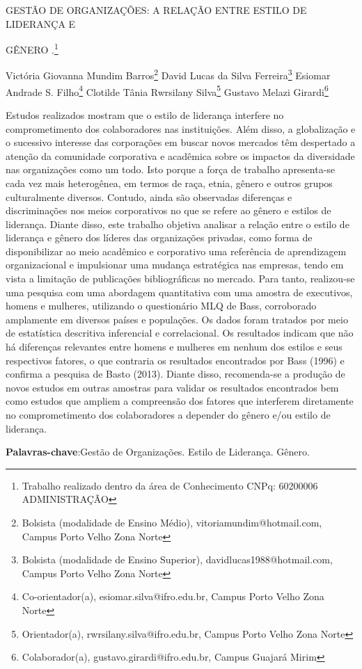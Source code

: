 \documentclass[article,12pt,onesidea,4paper,english,brazil]{abntex2}
\begin{document}
	
	
	\frenchspacing 
	
	\begin{center}
		\LARGE GESTÃO DE ORGANIZAÇÕES: A RELAÇÃO ENTRE ESTILO DE LIDERANÇA E
		
		GÊNERO
		.\footnote{Trabalho realizado dentro da área de Conhecimento CNPq: 60200006 ADMINISTRAÇÃO}
		
		\normalsize
		Victória Giovanna Mundim Barros\footnote{Bolsista (modalidade de Ensino Médio), vitoriamundim@hotmail.com, Campus Porto Velho Zona
			Norte} 
	   David Lucas da Silva Ferreira\footnote{
	   	Bolsista (modalidade de Ensino Superior), davidlucas1988@hotmail.com, Campus Porto Velho Zona
	   	Norte} 
		Esiomar Andrade S. Filho\footnote{Co-orientador(a), esiomar.silva@ifro.edu.br, Campus Porto Velho Zona Norte} 
		Clotilde Tânia
		Rwrsilany Silva\footnote{ Orientador(a), rwrsilany.silva@ifro.edu.br, Campus Porto Velho Zona Norte}
		Gustavo Melazi Girardi\footnote{Colaborador(a), gustavo.girardi@ifro.edu.br, Campus Guajará Mirim}  
	\end{center}
	
	\noindent Estudos realizados mostram que o estilo de liderança interfere no comprometimento
	dos colaboradores nas instituições. Além disso, a globalização e o sucessivo
	interesse das corporações em buscar novos mercados têm despertado a atenção da
	comunidade corporativa e acadêmica sobre os impactos da diversidade nas
	organizações como um todo. Isto porque a força de trabalho apresenta-se cada vez
	mais heterogênea, em termos de raça, etnia, gênero e outros grupos culturalmente
	diversos. Contudo, ainda são observadas diferenças e discriminações nos meios
	corporativos no que se refere ao gênero e estilos de liderança. Diante disso, este
	trabalho objetiva analisar a relação entre o estilo de liderança e gênero dos líderes
	das organizações privadas, como forma de disponibilizar ao meio acadêmico e
	corporativo uma referência de aprendizagem organizacional e impulsionar uma
	mudança estratégica nas empresas, tendo em vista a limitação de publicações
	bibliográficas no mercado. Para tanto, realizou-se uma pesquisa com uma
	abordagem quantitativa com uma amostra de executivos, homens e mulheres,
	utilizando o questionário MLQ de Bass, corroborado amplamente em diversos países
	e populações. Os dados foram tratados por meio de estatística descritiva inferencial
	e correlacional. Os resultados indicam que não há diferenças relevantes entre
	homens e mulheres em nenhum dos estilos e seus respectivos fatores, o que
	contraria os resultados encontrados por Bass (1996) e confirma a pesquisa de Basto
	(2013). Diante disso, recomenda-se a produção de novos estudos em outras
	amostras para validar os resultados encontrados bem como estudos que ampliem a
	compreensão dos fatores que interferem diretamente no comprometimento dos
	colaboradores a depender do gênero e/ou estilo de liderança.
	
	\vspace{\onelineskip}
	
	\noindent
	\textbf{Palavras-chave}:Gestão de Organizações. Estilo de Liderança. Gênero.
	
\end{document}
